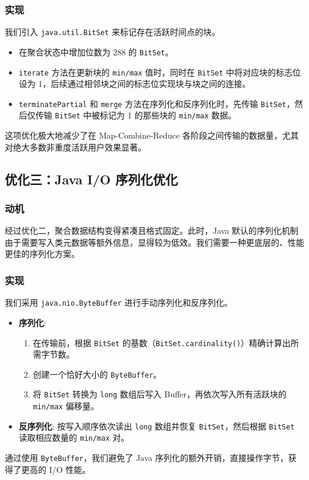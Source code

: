 \documentclass[UTF8]{ctexart}
\begin{document}
\FloatBarrier

\subsubsection{实现}
我们引入 \texttt{java.util.BitSet} 来标记存在活跃时间点的块。
\begin{itemize}
    \item 在聚合状态中增加位数为 288 的 \texttt{BitSet}。
    \item \texttt{iterate} 方法在更新块的 \texttt{min/max} 值时，同时在 \texttt{BitSet} 中将对应块的标志位设为 1，后续通过相邻块之间的标志位实现块与块之间的连接。
    \item \texttt{terminatePartial} 和 \texttt{merge} 方法在序列化和反序列化时，先传输 \texttt{BitSet}，然后仅传输 \texttt{BitSet} 中被标记为 1 的那些块的 \texttt{min/max} 数据。
\end{itemize}
这项优化极大地减少了在 Map-Combine-Reduce 各阶段之间传输的数据量，尤其对绝大多数非重度活跃用户效果显著。

\subsection{优化三：Java I/O 序列化优化}
\subsubsection{动机}
经过优化二，聚合数据结构变得紧凑且格式固定。此时，Java 默认的序列化机制由于需要写入类元数据等额外信息，显得较为低效。我们需要一种更底层的、性能更佳的序列化方案。

\subsubsection{实现}
我们采用 \texttt{java.nio.ByteBuffer} 进行手动序列化和反序列化。
\begin{itemize}
    \item \textbf{序列化}:
    \begin{enumerate}
        \item 在传输前，根据 \texttt{BitSet} 的基数（\texttt{BitSet.cardinality()}）精确计算出所需字节数。
        \item 创建一个恰好大小的 \texttt{ByteBuffer}。
        \item 将 \texttt{BitSet} 转换为 \texttt{long} 数组后写入 Buffer，再依次写入所有活跃块的 \texttt{min/max} 偏移量。
    \end{enumerate}
    \item \textbf{反序列化}: 按写入顺序依次读出 \texttt{long} 数组并恢复 \texttt{BitSet}，然后根据 \texttt{BitSet} 读取相应数量的 \texttt{min/max} 对。
\end{itemize}
通过使用 \texttt{ByteBuffer}，我们避免了 Java 序列化的额外开销，直接操作字节，获得了更高的 I/O 性能。
\end{document}
